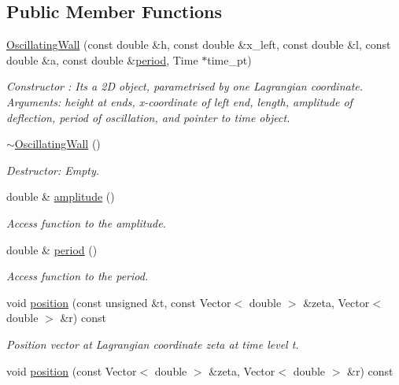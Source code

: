 \subsection*{Public Member Functions}
\begin{DoxyCompactItemize}
\item 
\hyperlink{classOscillatingWall_a5ededc3d27eef5c4ef7e82ac5cdf6ff9}{Oscillating\+Wall} (const double \&h, const double \&x\+\_\+left, const double \&l, const double \&a, const double \&\hyperlink{classOscillatingWall_ac3e0098c026e23dd8be8ea29f6a9c101}{period}, Time $\ast$time\+\_\+pt)
\begin{DoxyCompactList}\small\item\em Constructor \+: It\textquotesingle{}s a 2D object, parametrised by one Lagrangian coordinate. Arguments\+: height at ends, x-\/coordinate of left end, length, amplitude of deflection, period of oscillation, and pointer to time object. \end{DoxyCompactList}\item 
\hyperlink{classOscillatingWall_adc35b40bdd733a244d6399d91fa20ade}{$\sim$\+Oscillating\+Wall} ()
\begin{DoxyCompactList}\small\item\em Destructor\+: Empty. \end{DoxyCompactList}\item 
double \& \hyperlink{classOscillatingWall_ae923c6a7abefe33efaf47a4b69d1b621}{amplitude} ()
\begin{DoxyCompactList}\small\item\em Access function to the amplitude. \end{DoxyCompactList}\item 
double \& \hyperlink{classOscillatingWall_ac3e0098c026e23dd8be8ea29f6a9c101}{period} ()
\begin{DoxyCompactList}\small\item\em Access function to the period. \end{DoxyCompactList}\item 
void \hyperlink{classOscillatingWall_abb4ae7e556479d2980a56963bd8d4558}{position} (const unsigned \&t, const Vector$<$ double $>$ \&zeta, Vector$<$ double $>$ \&r) const
\begin{DoxyCompactList}\small\item\em Position vector at Lagrangian coordinate zeta at time level t. \end{DoxyCompactList}\item 
void \hyperlink{classOscillatingWall_a5fce6728f975003d9e85f64c18ba7f55}{position} (const Vector$<$ double $>$ \&zeta, Vector$<$ double $>$ \&r) const

\end{DoxyCompactItemize}
